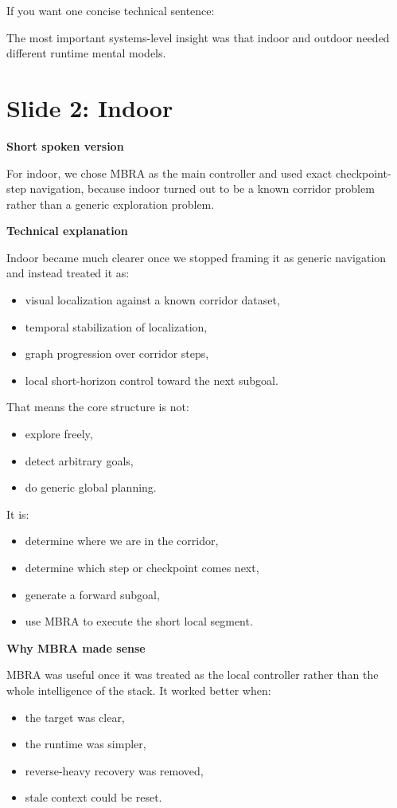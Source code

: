 \documentclass[11pt]{article}
\begin{document}
If you want one concise technical sentence:

The most important systems-level insight was that indoor and outdoor needed different runtime mental models.

\section*{Slide 2: Indoor}
\textbf{Short spoken version}

For indoor, we chose MBRA as the main controller and used exact checkpoint-step navigation, because indoor turned out to be a known corridor problem rather than a generic exploration problem.

\textbf{Technical explanation}

Indoor became much clearer once we stopped framing it as generic navigation and instead treated it as:
\begin{itemize}[leftmargin=*]
\item visual localization against a known corridor dataset,
\item temporal stabilization of localization,
\item graph progression over corridor steps,
\item local short-horizon control toward the next subgoal.
\end{itemize}

That means the core structure is not:
\begin{itemize}[leftmargin=*]
\item explore freely,
\item detect arbitrary goals,
\item do generic global planning.
\end{itemize}

It is:
\begin{itemize}[leftmargin=*]
\item determine where we are in the corridor,
\item determine which step or checkpoint comes next,
\item generate a forward subgoal,
\item use MBRA to execute the short local segment.
\end{itemize}

\textbf{Why MBRA made sense}

MBRA was useful once it was treated as the local controller rather than the whole intelligence of the stack. It worked better when:
\begin{itemize}[leftmargin=*]
\item the target was clear,
\item the runtime was simpler,
\item reverse-heavy recovery was removed,
\item stale context could be reset.
\end{itemize}
\end{document}

